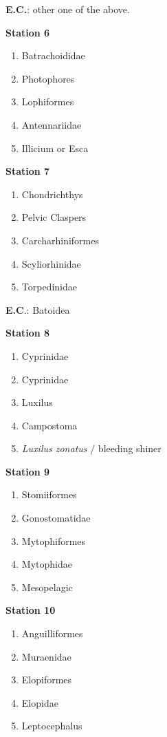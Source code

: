 \textbf{E.C.}: other one of the above.

\textbf{Station 6}

\begin{enumerate}
\def\labelenumi{\arabic{enumi}.}
\setcounter{enumi}{24}
\item
  Batrachoididae
\item
  Photophores
\item
  Lophiformes
\item
  Antennariidae
\item
  Illicium or Esca
\end{enumerate}

\textbf{Station 7}

\begin{enumerate}
\def\labelenumi{\arabic{enumi}.}
\setcounter{enumi}{29}
\item
  Chondrichthys
\item
  Pelvic Claspers
\item
  Carcharhiniformes
\item
  Scyliorhinidae
\item
  Torpedinidae
\end{enumerate}

\textbf{E.C}.: Batoidea

\textbf{Station 8}

\begin{enumerate}
\def\labelenumi{\arabic{enumi}.}
\setcounter{enumi}{34}
\item
  Cyprinidae
\item
  Cyprinidae
\item
  Luxilus
\item
  Campostoma
\item
  \emph{Luxilus zonatus} / bleeding shiner
\end{enumerate}

\textbf{Station 9}

\begin{enumerate}
\def\labelenumi{\arabic{enumi}.}
\setcounter{enumi}{39}
\item
  Stomiiformes
\item
  Gonostomatidae
\item
  Mytophiformes
\item
  Mytophidae
\item
  Mesopelagic
\end{enumerate}

\textbf{Station 10}

\begin{enumerate}
\def\labelenumi{\arabic{enumi}.}
\setcounter{enumi}{44}
\item
  Anguilliformes
\item
  Muraenidae
\item
  Elopiformes
\item
  Elopidae
\item
  Leptocephalus
\end{enumerate}

